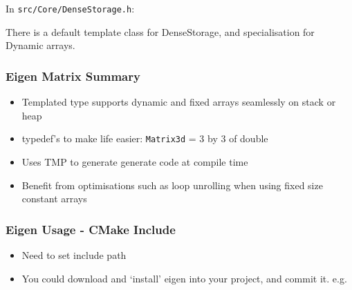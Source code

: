 In \texttt{src/Core/DenseStorage.h}:

\begin{Shaded}
\begin{Highlighting}[]

\NormalTok{<}   
\NormalTok{\{}
\end{Highlighting}
\end{Shaded}

There is a default template class for DenseStorage, and specialisation
for Dynamic arrays.

\subsubsection{Eigen Matrix Summary}\label{eigen-matrix-summary}

\begin{itemize}
\itemsep1pt\parskip0pt
\item
  Templated type supports dynamic and fixed arrays seamlessly on stack
  or heap
\item
  typedef's to make life easier: \texttt{Matrix3d} = 3 by 3 of double
\item
  Uses TMP to generate generate code at compile time
\item
  Benefit from optimisations such as loop unrolling when using fixed
  size constant arrays
\end{itemize}

\subsubsection{Eigen Usage - CMake
Include}\label{eigen-usage---cmake-include}

\begin{itemize}
\itemsep1pt\parskip0pt
\item
  Need to set include path
\item
  You could download and `install' eigen into your project, and commit
  it. e.g.
\end{itemize}

\begin{Shaded}
\begin{Highlighting}[]
\NormalTok{(}
\end{Highlighting}
\end{Shaded}

